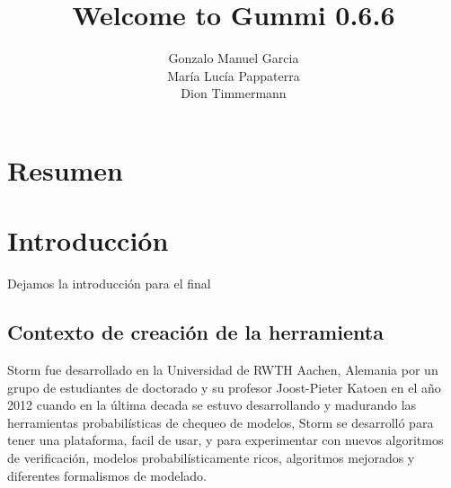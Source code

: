 \documentclass[11pt]{article}
\title{\textbf{Welcome to Gummi 0.6.6}}
\author{Gonzalo Manuel Garcia\\
		Mar\'ia Luc\'ia Pappaterra\\
		Dion Timmermann}
\date{}
\begin{document}
\maketitle

\section{Resumen}

\section{Introducci\'on}

Dejamos la introducci\'on para el final





\subsection{Contexto de creaci\'on de la herramienta} 

Storm fue desarrollado en la Universidad de RWTH Aachen, Alemania por un grupo de estudiantes de doctorado y su profesor Joost-Pieter Katoen en el a\~no 2012 cuando en la \'ultima decada se estuvo desarrollando y madurando las herramientas probabil\'isticas de chequeo de modelos, Storm se desarroll\'o para tener una plataforma, facil de usar, y para experimentar con nuevos algoritmos de verificaci\'on, modelos probabil\'isticamente ricos, algoritmos mejorados y diferentes formalismos de modelado.
\end{document}
